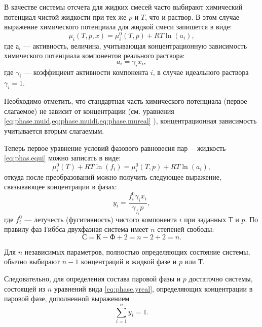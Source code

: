 В качестве системы отсчета для жидких смесей часто выбирают химический потенциал чистой жидкости  при тех же $p$ и $T$, что и раствор. В этом случае выражение химического потенциала для жидкой смеси запишется в виде:
\begin{equation}
	\mu_i(T,p,x)=\mu_i^0(T,p)+R T \ln (a_i),
\end{equation}
где $а_i$ --- активность, величина, учитывающая концентрационную зависимость химического потенциала компонентов реального раствора:
\begin{equation}
	a_i=\gamma_i x_i,
\end{equation}
где $\gamma_i$ --- коэффициент активности компонента $i$, в случае идеального раствора $\gamma_i =1 $.

Необходимо отметить, что стандартная часть химического потенциала (первое слагаемое) не зависит от концентрации (см. уравнения \cref{eq:phase.muid,eq:phase.muidi,eq:phase.mureal} ), концентрационная зависимость учитывается вторым слагаемым.

Теперь первое уравнение условий фазового равновесия пар~-- жидкость \eqref{eq:phas.equi} можно записать в виде:
\begin{equation}
	\mu_i^0(T)+RT \ln (f_i)=\mu_i^0(T,p)+ R T \ln (a_i),
\end{equation}
откуда после преобразований можно получить следующее выражение, связывающее концентрации в фазах:
\begin{equation} \label{eq:phase.yreal}
	y_i=\dfrac{f_i^0 \gamma_i x_i}{\gamma_{f_i} p},
\end{equation}
где $f_i^0$ --- летучесть (фугитивность) чистого компонента $i$ при заданных $Т$ и $p$. 
По правилу фаз Гиббса двухфазная система имеет $n$ степеней свободы:
\begin{equation*}
	С=К-Ф+2=n-2+2=n.
\end{equation*}

Для $n$ независимых параметров, полностью определяющих состояние системы, обычно выбирают $n-1$ концентраций в жидкой фазе и $p$ или $Т$.

Следовательно, для определения состава паровой	 фазы и $p$ достаточно системы, состоящей из $n$ уравнений вида \eqref{eq:phase.yreal}, определяющих концентрации в паровой фазе, дополненной выражением
\begin{equation}
	\sum\limits_{i=1}^{n} y_i =1.
\end{equation}

